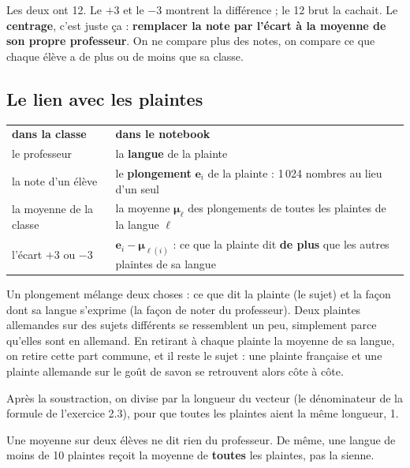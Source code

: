 Les deux ont 12. Le $+3$ et le $-3$ montrent la différence ; le 12 brut la cachait. Le
\textbf{centrage}, c'est juste ça : \textbf{remplacer la note par l'écart à la moyenne de son propre
professeur}. On ne compare plus des notes, on compare ce que chaque élève a de plus ou de moins que sa
classe.

\subsection{Le lien avec les plaintes}

\begin{center}
\renewcommand{\arraystretch}{1.35}
\begin{tabular}{@{}p{4.6cm}p{9.4cm}@{}}
\rowcolor{titlebg}\color{white}\textbf{dans la classe} & \color{white}\textbf{dans le notebook} \\
le professeur & la \textbf{langue} de la plainte \\
la note d'un élève & le \textbf{plongement} $\mathbf{e}_i$ de la plainte : 1\,024 nombres au lieu d'un seul \\
la moyenne de la classe & la moyenne $\boldsymbol{\mu}_\ell$ des plongements de toutes les plaintes de la langue $\ell$ \\
l'écart $+3$ ou $-3$ & $\mathbf{e}_i - \boldsymbol{\mu}_{\ell(i)}$ : ce que la plainte dit \textbf{de plus} que les autres plaintes de sa langue \\
\end{tabular}
\end{center}

Un plongement mélange deux choses : ce que dit la plainte (le sujet) et la façon dont sa langue
s'exprime (la \og façon de noter \fg{} du professeur). Deux plaintes allemandes sur des sujets différents
se ressemblent un peu, simplement parce qu'elles sont en allemand. En retirant à chaque plainte la
moyenne de sa langue, on retire cette part commune, et il reste le sujet : une plainte française et une
plainte allemande sur le goût de savon se retrouvent alors côte à côte.

\begin{tcbraster}[raster columns=2, raster equal height, raster column skip=8pt, raster every box/.style={unbreakable}]
\begin{conceptbox}[title={\faRulerCombined\ Puis on renorme}, unbreakable]
\small Après la soustraction, on divise par la longueur du vecteur (le dénominateur de la formule de
l'exercice 2.3), pour que toutes les plaintes aient la même longueur, 1.
\end{conceptbox}
\begin{conceptbox}[title={\faUsers\ Les petites classes}, unbreakable]
\small Une moyenne sur deux élèves ne dit rien du professeur. De même, une langue de moins de 10 plaintes
reçoit la moyenne de \textbf{toutes} les plaintes, pas la sienne.
\end{conceptbox}
\end{tcbraster}




